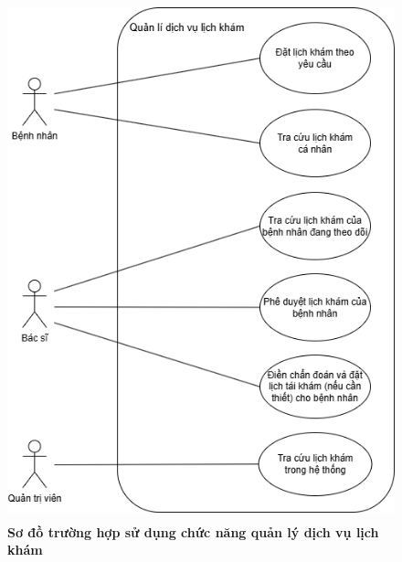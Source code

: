 \begin{figure}[H]
	\centering
	\includegraphics[width=12cm,height=15cm]{Images/use_case/use_case_schedule.png}
	\caption[Sơ đồ trường hợp sử dụng chức năng quản lý dịch vụ lịch khám]{\bfseries \fontsize{12pt}{0pt}
		\selectfont Sơ đồ trường hợp sử dụng chức năng quản lý dịch vụ lịch khám}
	\label{use_case_schedule} %
\end{figure}

